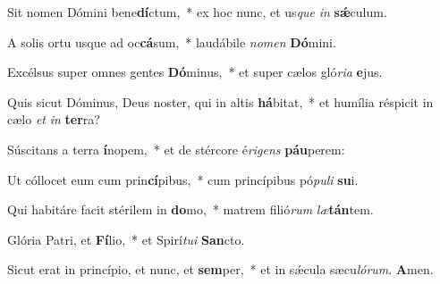 \item Sit nomen Dómini bene\textbf{dí}ctum,~* ex hoc nunc, et us\textit{que} \textit{in} \textbf{sǽ}culum.
\item A solis ortu usque ad oc\textbf{cá}sum,~* laudábile \textit{no}\textit{men} \textbf{Dó}mini.
\item Excélsus super omnes gentes \textbf{Dó}minus,~* et super cælos gló\textit{ri}\textit{a} \textbf{e}jus.
\item Quis sicut Dóminus, Deus noster, qui in altis \textbf{há}bitat,~* et humília réspicit in cælo \textit{et} \textit{in} \textbf{ter}ra?
\item Súscitans a terra \textbf{í}nopem,~* et de stércore é\textit{ri}\textit{gens} \textbf{páu}perem:
\item Ut cóllocet eum cum prin\textbf{cí}pibus,~* cum princípibus pó\textit{pu}\textit{li} \textbf{su}i.
\item Qui habitáre facit stérilem in \textbf{do}mo,~* matrem filió\textit{rum} \textit{læ}\textbf{tán}tem.
\item Glória Patri, et \textbf{Fí}lio,~* et Spirí\textit{tu}\textit{i} \textbf{San}cto.
\item Sicut erat in princípio, et nunc, et \textbf{sem}per,~* et in sǽcula sæcu\textit{ló}\textit{rum}. \textbf{A}men.
